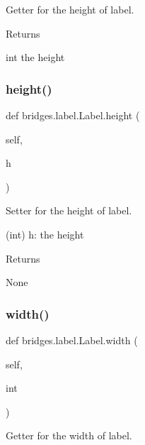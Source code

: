 Getter for the height of label. 

\begin{DoxyReturn}{Returns}


int the height 
\end{DoxyReturn}
\mbox{\label{classbridges_1_1label_1_1_label_a89643d25ae636d893538567bd249c530}} 
\subsubsection{\texorpdfstring{height()}{height()}\hspace{0.1cm}{\footnotesize\ttfamily [2/2]}}
{\footnotesize\ttfamily def bridges.\+label.\+Label.\+height (\begin{DoxyParamCaption}\item[{}]{self,  }\item[{}]{h }\end{DoxyParamCaption})}



Setter for the height of label. 

(int) h\+: the height \begin{DoxyReturn}{Returns}


None 
\end{DoxyReturn}
\mbox{\label{classbridges_1_1label_1_1_label_abb00a93c05cade8934ad2f89acd99c6c}} 
\subsubsection{\texorpdfstring{width()}{width()}\hspace{0.1cm}{\footnotesize\ttfamily [1/2]}}
{\footnotesize\ttfamily def bridges.\+label.\+Label.\+width (\begin{DoxyParamCaption}\item[{}]{self,  }\item[{}]{int }\end{DoxyParamCaption})}



Getter for the width of label. 

